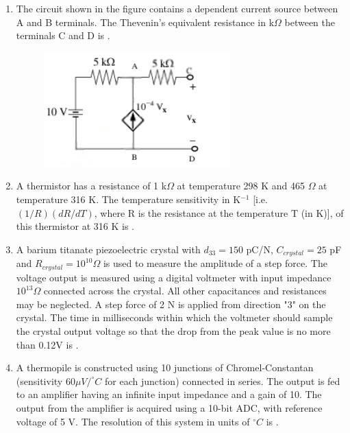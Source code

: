 \documentclass[journal,12pt,onecolumn]{IEEEtran}
\theoremstyle{remark}
\begin{document}
\begin{enumerate}
    \vspace{0.5cm}
    
    \item The circuit shown in the figure contains a dependent current source between A and B terminals. The Thevenin's equivalent resistance in k$\Omega$ between the terminals C and D is \underline{\hspace{2cm}}.
    \begin{figure}[H]
        \centering
        \includegraphics[width=0.5\columnwidth]{q32}
        \caption*{}
        \label{fig:placeholder}
    \end{figure}
    
    \item A thermistor has a resistance of 1 k$\Omega$ at temperature 298 K and 465 $\Omega$ at temperature 316 K. The temperature sensitivity in K$^{-1}$ [i.e. $(1/R)(dR/dT)$, where R is the resistance at the temperature T (in K)], of this thermistor at 316 K is \underline{\hspace{2cm}}.

    \vspace{0.5cm}
    
    \item A barium titanate piezoelectric crystal with $d_{33} = 150$ pC/N, $C_{crystal} = 25$ pF and $R_{crystal} = 10^{10} \Omega$ is used to measure the amplitude of a step force. The voltage output is measured using a digital voltmeter with input impedance $10^{13} \Omega$ connected across the crystal. All other capacitances and resistances may be neglected. A step force of 2 N is applied from direction "3" on the crystal. The time in milliseconds within which the voltmeter should sample the crystal output voltage so that the drop from the peak value is no more than 0.12V is \underline{\hspace{2cm}}.

    \vspace{0.5cm}
    
    \item A thermopile is constructed using 10 junctions of Chromel-Constantan (sensitivity $60\mu V/^\circ C$ for each junction) connected in series. The output is fed to an amplifier having an infinite input impedance and a gain of 10. The output from the amplifier is acquired using a 10-bit ADC, with reference voltage of 5 V. The resolution of this system in units of $^\circ C$ is \underline{\hspace{2cm}}.


\end{enumerate}
\end{document}
